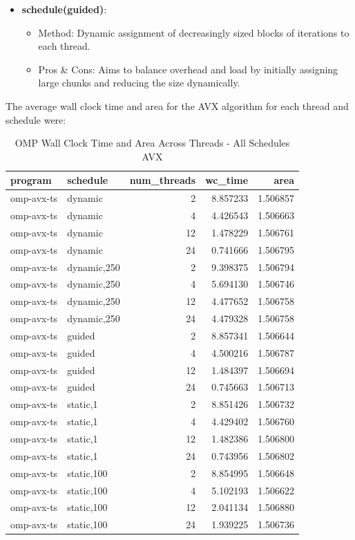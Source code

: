 \documentclass{article}
\begin{document}
\begin{itemize}
\item \textbf{schedule(guided)}:
  \begin{itemize}
    \item Method: Dynamic assignment of decreasingly sized blocks of iterations to each thread.
    \item Pros \& Cons: Aims to balance overhead and load by initially assigning large chunks and reducing the size dynamically.
  \end{itemize}
\end{itemize}
The average wall clock time and area for the AVX algorithm for each thread and schedule were:
\begin{table}[H]
    \centering
    \caption{OMP Wall Clock Time and Area Across Threads - All Schedules AVX}
    \centering
    \fontsize{12}{14}\selectfont
    \begin{tabular}[t]{l|l|r|r|r}
    \hline
    program & schedule & num\_threads & wc\_time & area\\
    \hline
    omp-avx-ts & dynamic & 2 & 8.857233 & 1.506857\\
    \hline
    omp-avx-ts & dynamic & 4 & 4.426543 & 1.506663\\
    \hline
    omp-avx-ts & dynamic & 12 & 1.478229 & 1.506761\\
    \hline
    omp-avx-ts & dynamic & 24 & 0.741666 & 1.506795\\
    \hline
    omp-avx-ts & dynamic,250 & 2 & 9.398375 & 1.506794\\
    \hline
    omp-avx-ts & dynamic,250 & 4 & 5.694130 & 1.506746\\
    \hline
    omp-avx-ts & dynamic,250 & 12 & 4.477652 & 1.506758\\
    \hline
    omp-avx-ts & dynamic,250 & 24 & 4.479328 & 1.506758\\
    \hline
    omp-avx-ts & guided & 2 & 8.857341 & 1.506644\\
    \hline
    omp-avx-ts & guided & 4 & 4.500216 & 1.506787\\
    \hline
    omp-avx-ts & guided & 12 & 1.484397 & 1.506694\\
    \hline
    omp-avx-ts & guided & 24 & 0.745663 & 1.506713\\
    \hline
    omp-avx-ts & static,1 & 2 & 8.851426 & 1.506732\\
    \hline
    omp-avx-ts & static,1 & 4 & 4.429402 & 1.506760\\
    \hline
    omp-avx-ts & static,1 & 12 & 1.482386 & 1.506800\\
    \hline
    omp-avx-ts & static,1 & 24 & 0.743956 & 1.506802\\
    \hline
    omp-avx-ts & static,100 & 2 & 8.854995 & 1.506648\\
    \hline
    omp-avx-ts & static,100 & 4 & 5.102193 & 1.506622\\
    \hline
    omp-avx-ts & static,100 & 12 & 2.041134 & 1.506880\\
    \hline
    omp-avx-ts & static,100 & 24 & 1.939225 & 1.506736\\
    \hline
    \end{tabular}
\end{table}
\end{document}
